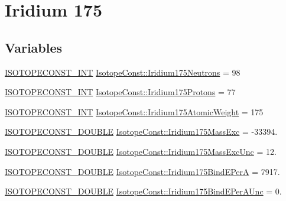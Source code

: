 \hypertarget{group___isotope_const-_iridium-_ir175}{}\section{Iridium 175}
\label{group___isotope_const-_iridium-_ir175}
\subsection*{Variables}
\begin{DoxyCompactItemize}
\item 
\mbox{\hyperlink{group___isotope_const-_macros_ga5f18360b3e99483a35c32d789e62621c}{I\+S\+O\+T\+O\+P\+E\+C\+O\+N\+S\+T\+\_\+\+I\+NT}} \mbox{\hyperlink{group___isotope_const-_iridium-_ir175_gac766e70207f15dcc6a1ca816da71262c}{Isotope\+Const\+::\+Iridium175\+Neutrons}} = 98
\item 
\mbox{\hyperlink{group___isotope_const-_macros_ga5f18360b3e99483a35c32d789e62621c}{I\+S\+O\+T\+O\+P\+E\+C\+O\+N\+S\+T\+\_\+\+I\+NT}} \mbox{\hyperlink{group___isotope_const-_iridium-_ir175_gace5d07ce89315a088d37365815f67219}{Isotope\+Const\+::\+Iridium175\+Protons}} = 77
\item 
\mbox{\hyperlink{group___isotope_const-_macros_ga5f18360b3e99483a35c32d789e62621c}{I\+S\+O\+T\+O\+P\+E\+C\+O\+N\+S\+T\+\_\+\+I\+NT}} \mbox{\hyperlink{group___isotope_const-_iridium-_ir175_gae40874c43a69a1df628be902ed164263}{Isotope\+Const\+::\+Iridium175\+Atomic\+Weight}} = 175
\item 
\mbox{\hyperlink{group___isotope_const-_macros_ga8f45a7272ce02c0b4c65c44636ed719a}{I\+S\+O\+T\+O\+P\+E\+C\+O\+N\+S\+T\+\_\+\+D\+O\+U\+B\+LE}} \mbox{\hyperlink{group___isotope_const-_iridium-_ir175_ga9cc9f62ad4c65c8a82bfaaaa0829ba2b}{Isotope\+Const\+::\+Iridium175\+Mass\+Exc}} = -\/33394.
\item 
\mbox{\hyperlink{group___isotope_const-_macros_ga8f45a7272ce02c0b4c65c44636ed719a}{I\+S\+O\+T\+O\+P\+E\+C\+O\+N\+S\+T\+\_\+\+D\+O\+U\+B\+LE}} \mbox{\hyperlink{group___isotope_const-_iridium-_ir175_gab98e5152a397530f7dd3ab5fdef52fc8}{Isotope\+Const\+::\+Iridium175\+Mass\+Exc\+Unc}} = 12.
\item 
\mbox{\hyperlink{group___isotope_const-_macros_ga8f45a7272ce02c0b4c65c44636ed719a}{I\+S\+O\+T\+O\+P\+E\+C\+O\+N\+S\+T\+\_\+\+D\+O\+U\+B\+LE}} \mbox{\hyperlink{group___isotope_const-_iridium-_ir175_ga967c227f83c548a9e321b50f20d98d36}{Isotope\+Const\+::\+Iridium175\+Bind\+E\+PerA}} = 7917.
\item 
\mbox{\hyperlink{group___isotope_const-_macros_ga8f45a7272ce02c0b4c65c44636ed719a}{I\+S\+O\+T\+O\+P\+E\+C\+O\+N\+S\+T\+\_\+\+D\+O\+U\+B\+LE}} \mbox{\hyperlink{group___isotope_const-_iridium-_ir175_ga396a19049d1a72ad4c4805872696b43f}{Isotope\+Const\+::\+Iridium175\+Bind\+E\+Per\+A\+Unc}} = 0.

\end{DoxyCompactItemize}
